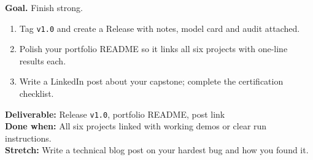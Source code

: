 \begin{tcolorbox}[enhanced,breakable,colback=white,colframe=sun,boxrule=0.8pt,arc=2pt,left=7pt,right=7pt,top=4pt,bottom=4pt,
  title={\bfseries Saturday --- Final release and portfolio\hfill\normalfont\small 3 h},coltitle=white,colbacktitle=sun,fonttitle=\small]
\textbf{Goal.} Finish strong.
\begin{enumerate}[itemsep=1pt,topsep=2pt]
  \item Tag \texttt{v1.0} and create a Release with notes, model card and audit attached.
  \item Polish your portfolio README so it links all six projects with one-line results each.
  \item Write a LinkedIn post about your capstone; complete the certification checklist.
\end{enumerate}
\textbf{\color{dataC}Deliverable:} Release \texttt{v1.0}, portfolio README, post link\\
\textbf{\color{navy}Done when:} All six projects linked with working demos or clear run instructions.\\
\textbf{\color{skillC}Stretch:} Write a technical blog post on your hardest bug and how you found it.
\end{tcolorbox}

